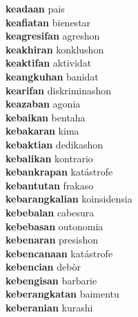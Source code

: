 \textbf{keadaan } pais \\
\textbf{keafiatan } bienestar \\
\textbf{keagresifan } agreshon \\
\textbf{keakhiran } konklushon \\
\textbf{keaktifan } aktividat \\
\textbf{keangkuhan } banidat \\
\textbf{kearifan } diskriminashon \\
\textbf{keazaban } agonia \\
\textbf{kebaikan } bentaha \\
\textbf{kebakaran } kima \\
\textbf{kebaktian } dedikashon \\
\textbf{kebalikan } kontrario \\
\textbf{kebankrapan } katástrofe \\
\textbf{kebantutan } frakaso \\
\textbf{kebarangkalian } koinsidensia \\
\textbf{kebebalan } cabesura \\
\textbf{kebebasan } outonomia \\
\textbf{kebenaran } presishon \\
\textbf{kebencanaan } katástrofe \\
\textbf{kebencian } debòr \\
\textbf{kebengisan } barbarie \\
\textbf{keberangkatan } baimentu \\
\textbf{keberanian } kurashi \\
